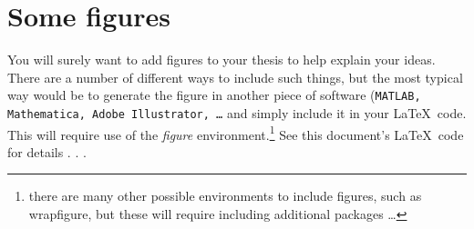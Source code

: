 \section{Some figures}

You will surely want to add figures to your thesis to help explain your ideas.  There are a number of different ways to include such things, but the most typical way would be to generate the figure in another piece of software (\texttt{MATLAB, Mathematica, Adobe Illustrator, \ldots} and simply include it in your \LaTeX ~code.  This will require use of the \emph{figure} environment.\footnote{there are many other possible environments to include figures, such as wrapfigure, but these will require including additional packages \ldots}  See this document's \LaTeX ~code for details . . .

